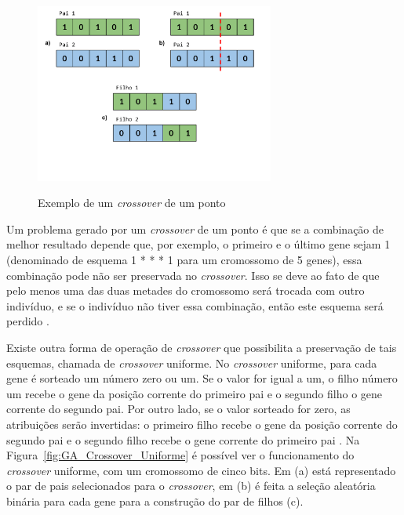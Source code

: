 \documentclass[12pt,oneside,a4paper,english,french,spanish,brazil,]{abntex2}
\begin{document}
\begin{figure}[ht]
\centering
\caption{Exemplo de um \textit{crossover} de um ponto}
\includegraphics[width=0.7\textwidth]{imagens/GA_Crossover_de_um_ponto.pdf}
\label{fig:GA_Crossover_de_um_ponto}
\end{figure}

Um problema gerado por um \textit{crossover} de um ponto é que se a combinação de melhor resultado depende que, por exemplo, o primeiro e o último gene sejam 1 (denominado de esquema 1 * * * 1 para um cromossomo de 5 genes), essa combinação pode não ser preservada no \textit{crossover}. Isso se deve ao fato de que pelo menos uma das duas metades do cromossomo será trocada com outro indivíduo, e se o indivíduo não tiver essa combinação, então este esquema será perdido \cite{linden:2008}.

Existe outra forma de operação de \textit{crossover} que possibilita a preservação de tais esquemas, chamada de \textit{crossover} uniforme. No \textit{crossover} uniforme, para cada gene é sorteado um número zero ou um. Se o valor for igual a um, o filho número um recebe o gene da posição corrente do primeiro pai e o segundo filho o gene corrente do segundo pai. Por outro lado, se o valor sorteado for zero, as atribuições serão invertidas: o primeiro filho recebe o gene da posição corrente do segundo pai e o segundo filho recebe o gene corrente do primeiro pai \cite{linden:2008}. Na Figura~\ref{fig:GA_Crossover_Uniforme} é possível ver o funcionamento do \textit{crossover} uniforme, com um cromossomo de cinco bits. Em (a) está representado o par de pais selecionados para o \textit{crossover}, em (b) é feita a seleção aleatória binária para cada gene para a construção do par de filhos (c).
\end{document}
